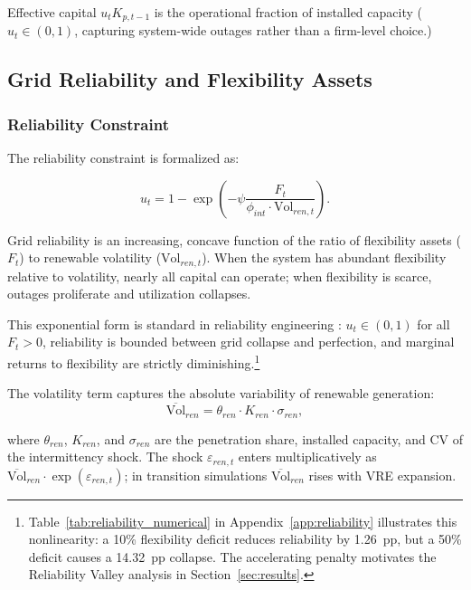 	Effective capital $u_t K_{p,t-1}$ is the operational fraction of installed capacity ($u_t \in (0,1)$, capturing system-wide outages rather than a firm-level choice.)
	
	\subsection{Grid Reliability and Flexibility Assets}
	
	\subsubsection{Reliability Constraint}
	
	The reliability constraint is formalized as:
	
	\begin{equation}
		u_t = 1 - \exp\left(-\psi \frac{F_t}{\phi_{int} \cdot \text{Vol}_{ren,t}}\right)
		\label{eq:utilization}.
	\end{equation}
	
	Grid reliability is an increasing, concave function of the ratio of flexibility assets ($F_t$) to renewable volatility ($\text{Vol}_{ren,t}$). When the system has abundant flexibility relative to volatility, nearly all capital can operate; when flexibility is scarce, outages proliferate and utilization collapses.
	
	This exponential form is standard in reliability engineering \citep{zakeri2015, lund2015}: $u_t \in (0,1)$ for all $F_t > 0$, reliability is bounded between grid collapse and perfection, and marginal returns to flexibility are strictly diminishing.\footnote{Table~\ref{tab:reliability_numerical} in Appendix~\ref{app:reliability} illustrates this nonlinearity: a 10\% flexibility deficit reduces reliability by 1.26~pp, but a 50\% deficit causes a 14.32~pp collapse. The accelerating penalty motivates the Reliability Valley analysis in Section~\ref{sec:results}.}
	
	The volatility term captures the absolute variability of renewable generation:
	\begin{equation}
		\overline{\text{Vol}}_{ren} = \theta_{ren} \cdot K_{ren} \cdot \sigma_{ren}
		\label{eq:renewable_volatility},
	\end{equation}
	
	where $\theta_{ren}$, $K_{ren}$, and $\sigma_{ren}$ are the penetration share, installed capacity, and CV of the intermittency shock. The shock $\varepsilon_{ren,t}$ enters multiplicatively as $\overline{\text{Vol}}_{ren}\cdot\exp(\varepsilon_{ren,t})$; in transition simulations $\overline{\text{Vol}}_{ren}$ rises with VRE expansion.
	
